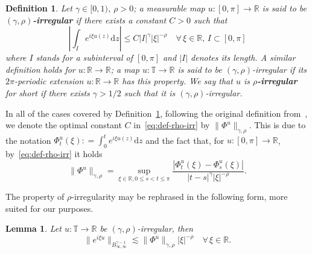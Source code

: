 \documentclass[11pt,oneside,reqno]{amsart}
\newcommand{\mathd}{\mathrm{d}}
\newcommand{\tmdfn}[1]{\textbf{#1}}
\newtheorem{definition}[theorem]{Definition}
\newtheorem{lemma}[theorem]{Lemma}
\numberwithin{equation}{section}
\begin{document}
\begin{definition}
  \label{def:rho-irr}Let $\gamma \in [0, 1)$, $\rho > 0$; a measurable map $u
  : [0, \pi] \rightarrow \mathbb{R}$ is said to be {\tmdfn{$(\gamma,
  \rho)$-irregular}} if there exists a constant $C > 0$ such that
  \begin{equation}
    \left| \int_I e^{i \xi u (z)} \mathd z \right| \leqslant C | I |^{\gamma} 
    | \xi |^{- \rho} \quad \forall \, \xi \in \mathbb{R}, \, I \subset [0,
    \pi] \label{eq:def-rho-irr}
  \end{equation}
  where $I$ stands for a subinterval of $[0, \pi]$ and $| I |$ denotes its
  length. A similar definition holds for $u : \mathbb{R} \rightarrow
  \mathbb{R}$; a map $u : \mathbb{T} \rightarrow \mathbb{R}$ is said to be
  $(\gamma, \rho)$-irregular if its $2 \pi$-periodic extension
  $u : \mathbb{R} \rightarrow \mathbb{R}$ has this property. We say that $u$
  is {\tmdfn{$\rho$-irregular}} for short if there exists $\gamma > 1 / 2$
  such that it is $(\gamma, \rho)$-irregular.
\end{definition}

In all of the cases covered by Definition~\ref{def:rho-irr},
following the original definition from~{\cite{catellier2016averaging}}, we
denote the optimal constant $C$ in~\eqref{eq:def-rho-irr} by $\| \Phi^u
\|_{\gamma, \rho}$. This is due to the notation $\Phi^u_t (\xi) : = \int_0^t
e^{i \xi u (z)} \mathd z$ and the fact that, for $u : [0, \pi] \rightarrow
\mathbb{R}$, by~\eqref{eq:def-rho-irr} it holds
\[ \| \Phi^u \|_{\gamma, \rho} = \sup_{\xi \in \mathbb{R}, 0 \leqslant s < t
   \leqslant \pi} \frac{| \Phi^u_t (\xi) - \Phi^u_s (\xi) |}{| t - s
   |^{\gamma} | \xi |^{- \rho}} . \]

The property of $\rho$-irregularity may be rephrased in the following form,
more suited for our purposes.

\begin{lemma}
  \label{lem:alternative-rho}Let $u : \mathbb{T} \rightarrow \mathbb{R}$ be
  $(\gamma, \rho)$-irregular, then
  \[ \| e^{i \xi u} \|_{B^{\gamma - 1}_{\infty, \infty}} \lesssim \| \Phi^u
     \|_{\gamma, \rho}  | \xi |^{- \rho} \quad \forall \, \xi \in \mathbb{R}.
  \]
\end{lemma}
\end{document}
